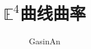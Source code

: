 \documentclass[12pt]{ctexart}
\title{$\mathbb{E}^4$曲线曲率}
\author{GasinAn}
\begin{document}
\begin{figure}
    
\end{figure}
\end{document}

